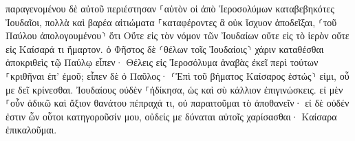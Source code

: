 \documentclass{openreader}
\begin{document}
παραγενομένου δὲ αὐτοῦ περιέστησαν ⸀αὐτὸν οἱ ἀπὸ Ἱεροσολύμων καταβεβηκότες Ἰουδαῖοι, πολλὰ καὶ βαρέα αἰτιώματα ⸀καταφέροντες ἃ οὐκ ἴσχυον ἀποδεῖξαι, 
⸂τοῦ Παύλου ἀπολογουμένου⸃ ὅτι Οὔτε εἰς τὸν νόμον τῶν Ἰουδαίων οὔτε εἰς τὸ ἱερὸν οὔτε εἰς Καίσαρά τι ἥμαρτον. 
ὁ Φῆστος δὲ ⸂θέλων τοῖς Ἰουδαίοις⸃ χάριν καταθέσθαι ἀποκριθεὶς τῷ Παύλῳ εἶπεν· Θέλεις εἰς Ἱεροσόλυμα ἀναβὰς ἐκεῖ περὶ τούτων ⸀κριθῆναι ἐπ’ ἐμοῦ; 
εἶπεν δὲ ὁ Παῦλος· ⸂Ἐπὶ τοῦ βήματος Καίσαρος ἑστώς⸃ εἰμι, οὗ με δεῖ κρίνεσθαι. Ἰουδαίους οὐδὲν ⸀ἠδίκησα, ὡς καὶ σὺ κάλλιον ἐπιγινώσκεις. 
εἰ μὲν ⸀οὖν ἀδικῶ καὶ ἄξιον θανάτου πέπραχά τι, οὐ παραιτοῦμαι τὸ ἀποθανεῖν· εἰ δὲ οὐδέν ἐστιν ὧν οὗτοι κατηγοροῦσίν μου, οὐδείς με δύναται αὐτοῖς χαρίσασθαι· Καίσαρα ἐπικαλοῦμαι. 
\end{document}
